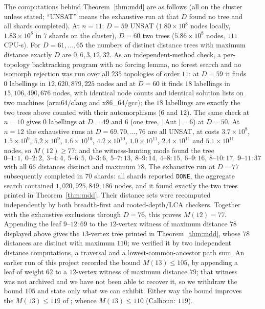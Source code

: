 \documentclass[11pt,a4paper]{article}
\theoremstyle{plain}
\theoremstyle{remark}
\newcommand{\Aut}{\operatorname{Aut}}
\begin{document}
The computations behind Theorem~\ref{thm:mdd} are as follows (all on the cluster
unless stated; ``UNSAT'' means the exhaustive run at that $D$ found no tree and
all shards completed).  At $n=11$: $D=59$ UNSAT ($1.80\times10^8$ nodes locally,
$1.83\times10^8$ in $7$ shards on the cluster), $D=60$ two trees
($5.86\times10^8$ nodes, $111$ CPU-s).  For $D=61,\dots,65$ the numbers of
distinct distance trees with maximum distance exactly $D$ are $0,6,3,12,32$.
As an independent-method check, a per-topology backtracking program with no
forcing lemma, no forest search and no isomorph rejection was run over all
$235$ topologies of order $11$: at $D=59$ it finds $0$ labellings in
$12{,}620{,}879{,}225$ nodes and at $D=60$ it finds $18$ labellings in
$15{,}106{,}490{,}676$ nodes, with identical node counts and identical solution
lists on two machines (arm64/clang and x86\_64/gcc); the $18$ labellings are
exactly the two trees above counted with their automorphisms ($6$ and $12$).
The same check at $n=10$ gives $0$ labellings at $D=49$ and $6$ (one tree,
$|\Aut|=6$) at $D=50$.  At $n=12$ the exhaustive runs at
$D=69,70,\dots,76$ are all UNSAT, at costs $3.7\times10^8$, $1.5\times10^9$,
$5.2\times10^9$, $1.6\times10^{10}$, $4.2\times10^{10}$, $1.0\times10^{11}$,
$2.4\times10^{11}$ and $5.1\times10^{11}$ nodes, so $M(12)\ge 77$; and the
witness-hunting mode found the tree
\[
0\text{--}1{:}1,\ 0\text{--}2{:}2,\ 3\text{--}4{:}4,\ 5\text{--}6{:}5,\ 0\text{--}3{:}6,\
5\text{--}7{:}13,\ 8\text{--}9{:}14,\ 4\text{--}8{:}15,\ 6\text{--}9{:}16,\ 8\text{--}10{:}17,\
9\text{--}11{:}37
\]
with all $66$ distances distinct and maximum $78$.  The exhaustive run at
$D=77$ subsequently completed in $70$ shards: all shards reported \texttt{DONE},
the aggregate search contained $1{,}020{,}925{,}849{,}186$ nodes, and it found
exactly the two trees printed in Theorem~\ref{thm:mdd}.  Their distance sets were
recomputed independently by both breadth-first and rooted-depth/LCA checkers.
Together with the exhaustive exclusions through $D=76$, this proves
$M(12)=77$.  Appending the leaf $9\text{--}12{:}69$ to the $12$-vertex
witness of maximum distance $78$ displayed above gives the $13$-vertex tree
printed in Theorem~\ref{thm:mdd}, whose $78$ distances are distinct with
maximum $110$; we verified it by two independent distance computations, a
traversal and a lowest-common-ancestor path sum.  An earlier run of this project
recorded the bound $M(13)\le105$, by appending a leaf of weight $62$ to a
$12$-vertex witness of maximum distance $79$; that witness was not archived and
we have not been able to recover it, so we withdraw the bound $105$ and state
only what we can exhibit.  Either way the bound improves the $M(13)\le119$ of
\cite{Calhoun2007}; whence
$M(13)\le 110$ (Calhoun: $119$).
\end{document}
